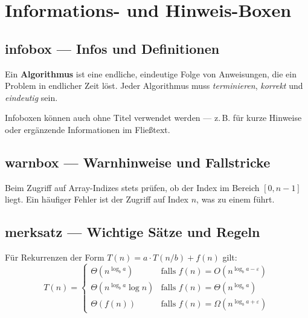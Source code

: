 
\section{Informations- und Hinweis-Boxen}

\subsection{infobox — Infos und Definitionen}

\begin{infobox}
  Ein \textbf{Algorithmus} ist eine endliche, eindeutige Folge von Anweisungen,
  die ein Problem in endlicher Zeit löst. Jeder Algorithmus muss
  \emph{terminieren}, \emph{korrekt} und \emph{eindeutig} sein.
\end{infobox}

\begin{infobox}
  Infoboxen können auch ohne Titel verwendet werden — z.\,B. für kurze
  Hinweise oder ergänzende Informationen im Fließtext.
\end{infobox}

\subsection{warnbox — Warnhinweise und Fallstricke}

\begin{warnbox}
  Beim Zugriff auf Array-Indizes stets prüfen, ob der Index im Bereich
  $[0, n-1]$ liegt. Ein häufiger Fehler ist der Zugriff auf Index $n$,
  was zu einem  führt.
\end{warnbox}

\subsection{merksatz — Wichtige Sätze und Regeln}

\begin{merksatz}
  Für Rekurrenzen der Form $T(n) = a \cdot T(n/b) + f(n)$ gilt:
  \[
    T(n) = \begin{cases}
      \Theta(n^{\log_b a})       & \text{falls } f(n) = O(n^{\log_b a - \varepsilon}) \\
      \Theta(n^{\log_b a}\log n) & \text{falls } f(n) = \Theta(n^{\log_b a}) \\
      \Theta(f(n))               & \text{falls } f(n) = \Omega(n^{\log_b a + \varepsilon})
    \end{cases}
  \]
\end{merksatz}

